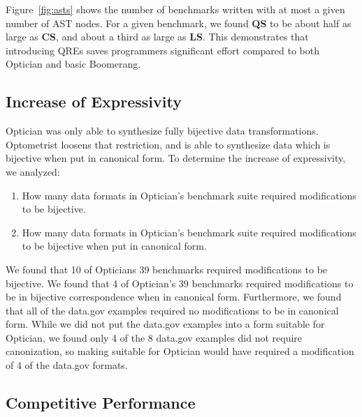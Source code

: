 \documentclass[acmsmall,review,anonymous]{acmart}
\newcommand{\Name}{Optometrist}
\newcommand{\QRESize}{\textbf{QS}}
\newcommand{\CanonizerAndSpecSize}{\textbf{CS}}
\newcommand{\LensAndSpecSize}{\textbf{LS}}
\begin{document}
Figure~\ref{fig:asts} shows the number of benchmarks written with at most a
given number of AST nodes. For a given benchmark, we found \QRESize{} to be
about half as large as \CanonizerAndSpecSize, and about a third as large as
\LensAndSpecSize{}. This demonstrates that introducing QREs saves programmers
significant effort compared to both Optician and basic Boomerang.

\subsection{Increase of Expressivity}

Optician was only able to synthesize fully bijective data transformations.
\Name{} loosens that restriction, and is able to synthesize data which is
bijective when put in canonical form.
To determine the increase of expressivity, we analyzed:
\begin{enumerate}
  \item How many data formats in Optician's benchmark suite required modifications
  to be bijective.
  \item How many data formats in Optician's benchmark suite required modifications
  to be bijective when put in canonical form.
\end{enumerate}

We found that 10 of Opticians 39 benchmarks required modifications to be
bijective. We found that 4 of Optician's 39
benchmarks required modifications to be in bijective correspondence when in
canonical form.  Furthermore, we found that all of the data.gov examples
required no modifications to be in canonical form.  While we did not put the
data.gov examples into a form suitable for Optician, we found only 4 of
the 8 data.gov examples did not require canonization, so making suitable
for Optician would have required a modification of 4 of the data.gov
formats.

\subsection{Competitive Performance}
\end{document}
